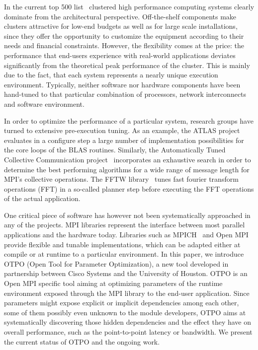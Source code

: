 In the current top 500 list~\cite{top500} clustered high performance computing systems clearly dominate from the architectural perspective. Off-the-shelf components make clusters attractive for low-end budgets as well as for large scale installations, since they offer the opportunity to customize the equipment according to their needs and financial constraints. However, the flexibility comes at the price: the performance that end-users experience with real-world applications deviates significantly from the theoretical peak performance of the cluster. This is mainly due to the fact, that each system represents a nearly unique execution environment. Typically, neither software nor hardware components have been hand-tuned to that particular combination of processors, network interconnects and software environment. %

In order to optimize the performance of a particular system, research groups have turned to extensive pre-execution tuning. As an example, the ATLAS project~\cite{atlas} evaluates in a configure step a large number of implementation possibilities for the core loops of the BLAS routines. Similarly, the Automatically Tuned Collective Communication project~\cite{pjesa:cluster} incorporates an exhaustive search in order to determine the best performing algorithms for a wide range of message length for MPI's collective operations.  The FFTW library~\cite{fftw} tunes fast fourier transform operations (FFT) in a so-called planner step before executing the FFT operations of the actual application.

One critical piece of software has however not been systematically approached in any of the projects. MPI libraries represent the interface between most parallel applications and the hardware today. Libraries such as MPICH~\cite{Gropp:1996:HPI} and Open MPI~\cite{gabriel:ompi} provide flexible and tunable implementations, which can be adapted either at compile or at runtime to a particular environment. In this paper, we introduce OTPO (Open Tool for Parameter Optimization), a new tool developed in partnership between Cisco Systems and the University of Houston. OTPO is an Open MPI specific tool aiming at optimizing parameters of the runtime environment exposed through the MPI library to the end-user application. Since parameters might expose explicit or implicit dependencies among each other, some of them possibly even unknown to the module developers, OTPO aims at systematically discovering those hidden dependencies and the effect they have on overall performance, such as the point-to-point latency or bandwidth. We present the current status of OTPO and the ongoing work.

